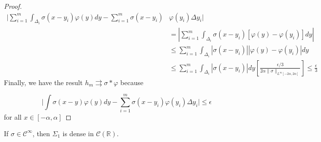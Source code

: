 \documentclass[../main.tex]{subfiles}
\begin{document}
\begin{proof}
\begin{equation*} 
	\begin{split}
		\Bigg| \sum_{i=1}^m \int_{\Delta_i} \sigma(x-y_i)\varphi(y)dy -  \sum_{i=1}^m \sigma(x-y_i)& \varphi(y_i)\Delta y_i \Bigg| \\
		& =  \left|  \sum_{i=1}^m \int_{\Delta_i} \sigma(x-y_i) [\varphi(y)-\varphi(y_i)] dy \right| \\
		& \leq  \sum_{i=1}^m \int_{\Delta_i}  \left| \sigma(x-y_i)\right| \left| \varphi(y) - \varphi(y_i)\right|dy  \\
		& \leq  \sum_{i=1}^m \int_{\Delta_i}  \left| \sigma(x-y_i)\right| dy \left[ \frac{\epsilon/3}{2\alpha \| \sigma\|_{L^\infty[-2\alpha,2\alpha]}}\right]  \leq \frac{\epsilon}{3} 
	\end{split}
\end{equation*}
Finally, we have the result $h_m \rightrightarrows \sigma \ast \varphi $ because

$$\Bigg| \int \sigma(x-y)\varphi(y)dy -  \sum_{i=1}^m \sigma(x-y_i) \varphi(y_i) \Delta y_i \Bigg| \leq \epsilon $$
for all $x\in [-\alpha,\alpha ]$
	\end{proof}
	
	\begin{lema} %
		If $\sigma \in \mathcal{C}^{\infty}$, then $ \Sigma_1$ is dense in  $\mathcal{C}(\mathbb{R})$.
	\end{lema}
	
\end{document}
